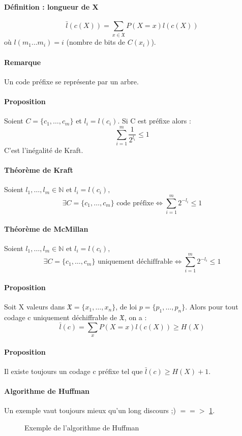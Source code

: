 \documentclass[12pt,a4paper]{report}
\begin{document}
\paragraph{Définition : longueur de X\\}
$$ \bar{l}(c(X))=\sum_{x \in \mathfrak{X} } P(X=x) l(c(X)) $$
où $ l(m_1\ldots m_i)=i $ (nombre de bits de $C(x_i)$).
\paragraph{Remarque\\}
Un code préfixe se représente par un arbre.
\paragraph{Proposition\\}
Soient $ C=\{c_1,\ldots,c_m\} $ et $ l_i=l(c_i)$. Si C est préfixe alors :
$$ \sum_{i=1}^{m}\frac{1}{2^{l_i}} \leqslant 1 $$
C'est l'inégalité de Kraft.
\paragraph{Théorème de Kraft \\}
Soient $ l_1,\ldots,l_m \in \mathbb{N}$ et $l_i=l(c_i),$
$$ \exists C =\{c_1,\ldots,c_m\} \mbox{ code préfixe} \Longleftrightarrow \sum_{i=1}^{m} 2^{-l_i} \leqslant 1 $$
\paragraph{Théorème de McMillan\\}
Soient $ l_1,\ldots,l_m \in \mathbb{N}$ et $l_i=l(c_i),$ 
$$ \exists C =\{c_1,\ldots,c_m\} \mbox{ uniquement déchiffrable} \Longleftrightarrow \sum_{i=1}^{m} 2^{-l_i} \leqslant 1 $$
\paragraph{Proposition\\}
Soit X  valeurs dans $\mathfrak{X} =\{x_1,\ldots,x_n\}$, de loi $ p = \{p_1,\ldots,p_n\}$. Alors pour tout codage c uniquement déchiffrable de $ \mathfrak{X}  $, on a :
$$ \bar{l}(c) = \sum_{x} P(X=x) l(c(X)) \geqslant H(X) $$
\paragraph{Proposition\\}
Il existe toujours un codage c préfixe tel que $ \bar{l}(c) \geqslant H(X) + 1 $.
\paragraph{Algorithme de Huffman\\}
Un exemple vaut toujours mieux qu'un long discours ;) $ ==>$ \ref{huf}.
\begin{figure}[h]
	\centering
  \scalebox{0.5}{}
  \caption{\label{huf}Exemple de l'algorithme de Huffman}	
\end{figure}
\end{document}

